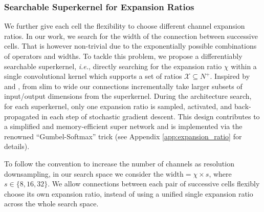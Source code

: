\documentclass{article} \usepackage{iclr2020_conference,times}
\begin{document}
\subsubsection{Searchable Superkernel for Expansion Ratios}
We further give each cell the flexibility to choose different channel expansion ratios. In our work, we search for the width of the connection between successive cells.
That is however non-trivial due to the exponentially possible combinations of operators and widths.
To tackle this problem, we propose a differentiably searchable superkernel, \textit{i.e.}, directly searching for the expansion ratio $\chi$ within a single convolutional kernel which supports a set of ratios $\mathcal{X} \subseteq N^+$. Inspired by \citep{yu2018slimmable} and \citep{stamoulis2019single}, from slim to wide our connections incrementally take larger subsets of input/output dimensions from the superkernel. During the architecture search, for each superkernel, only one expansion ratio is sampled, activated, and back-propagated in each step of stochastic gradient descent. This design contributes to a simplified and memory-efficient super network and is implemented via the renowned ``Gumbel-Softmax'' trick (see Appendix \ref{app:expansion_ratio} for details).

To follow the convention to increase the number of channels as resolution downsampling, in our search space we consider the
$\mathrm{width} = \chi \times s$, where $s \in \{8, 16, 32\}$. We allow connections between each pair of successive cells flexibly choose its own expansion ratio, instead of using a unified single expansion ratio across the whole search space.\vspace{-0.5em}
\end{document}
